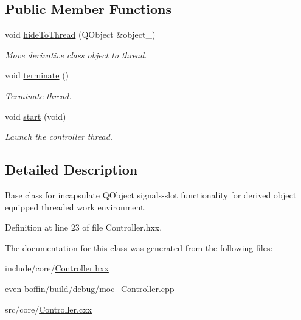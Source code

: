 \subsection*{Public Member Functions}
\begin{DoxyCompactItemize}
\item 
\mbox{\label{classeven_1_1___controller_a380f99350da6056e8a2380812f300920}} 
void \mbox{\hyperlink{classeven_1_1___controller_a380f99350da6056e8a2380812f300920}{hide\+To\+Thread}} (Q\+Object \&object\+\_\+)
\begin{DoxyCompactList}\small\item\em Move derivative class object to thread. \end{DoxyCompactList}\item 
\mbox{\label{classeven_1_1___controller_a87b31946ef3f764ec6e49a067b4cfd48}} 
void \mbox{\hyperlink{classeven_1_1___controller_a87b31946ef3f764ec6e49a067b4cfd48}{terminate}} ()
\begin{DoxyCompactList}\small\item\em Terminate thread. \end{DoxyCompactList}\item 
\mbox{\label{classeven_1_1___controller_a3ac41d973e56d7dd0396a50d7aa2d2dd}} 
void \mbox{\hyperlink{classeven_1_1___controller_a3ac41d973e56d7dd0396a50d7aa2d2dd}{start}} (void)
\begin{DoxyCompactList}\small\item\em Launch the controller thread. \end{DoxyCompactList}\end{DoxyCompactItemize}


\subsection{Detailed Description}
Base class for incapsulate Q\+Object signals-\/slot functionality for derived object equipped threaded work environment. 

Definition at line 23 of file Controller.\+hxx.



The documentation for this class was generated from the following files\+:\begin{DoxyCompactItemize}
\item 
include/core/\mbox{\hyperlink{_controller_8hxx}{Controller.\+hxx}}\item 
even-\/boffin/build/debug/moc\+\_\+\+Controller.\+cpp\item 
src/core/\mbox{\hyperlink{_controller_8cxx}{Controller.\+cxx}}\end{DoxyCompactItemize}
